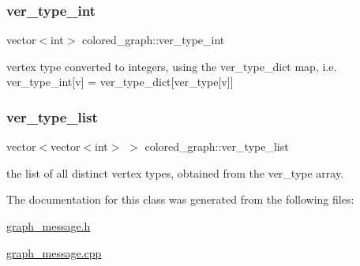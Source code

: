 \subsubsection{\texorpdfstring{ver\+\_\+type\+\_\+int}{ver\_type\_int}}
{\footnotesize\ttfamily vector$<$int$>$ colored\+\_\+graph\+::ver\+\_\+type\+\_\+int}



vertex type converted to integers, using the ver\+\_\+type\+\_\+dict map, i.\+e. ver\+\_\+type\+\_\+int\mbox{[}v\mbox{]} = ver\+\_\+type\+\_\+dict\mbox{[}ver\+\_\+type\mbox{[}v\mbox{]}\mbox{]} 

\mbox{\label{classcolored__graph_a3a1ae8abac458d20a2afb4aa48bbc956}} 
\subsubsection{\texorpdfstring{ver\+\_\+type\+\_\+list}{ver\_type\_list}}
{\footnotesize\ttfamily vector$<$vector$<$int$>$ $>$ colored\+\_\+graph\+::ver\+\_\+type\+\_\+list}



the list of all distinct vertex types, obtained from the ver\+\_\+type array. 



The documentation for this class was generated from the following files\+:\begin{DoxyCompactItemize}
\item 
\hyperlink{graph__message_8h}{graph\+\_\+message.\+h}\item 
\hyperlink{graph__message_8cpp}{graph\+\_\+message.\+cpp}\end{DoxyCompactItemize}
